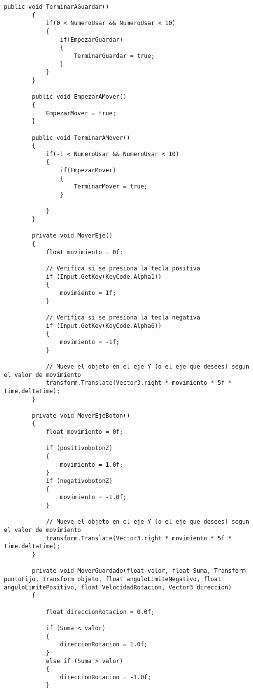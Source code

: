 \begin{lstlisting}[frame=single]
        public void TerminarAGuardar()
        {
            if(0 < NumeroUsar && NumeroUsar < 10)
            {
                if(EmpezarGuardar)
                {
                    TerminarGuardar = true;
                }
            }
        }
    
        public void EmpezarAMover()
        {
            EmpezarMover = true;
        }
    
        public void TerminarAMover()
        {
            if(-1 < NumeroUsar && NumeroUsar < 10)
            {
                if(EmpezarMover)
                {
                    TerminarMover = true;
                }
                
            }
        }
    
        private void MoverEje()
        {
            float movimiento = 0f;
    
            // Verifica si se presiona la tecla positiva
            if (Input.GetKey(KeyCode.Alpha1))
            {
                movimiento = 1f;
            }
    
            // Verifica si se presiona la tecla negativa
            if (Input.GetKey(KeyCode.Alpha6))
            {
                movimiento = -1f;
            }
    
            // Mueve el objeto en el eje Y (o el eje que desees) segun el valor de movimiento
            transform.Translate(Vector3.right * movimiento * 5f * Time.deltaTime);
        }
    
        private void MoverEjeBoton()
        {
            float movimiento = 0f;
    
            if (positivobotonZ)
            {
                movimiento = 1.0f;
            }
            if (negativobotonZ)
            {
                movimiento = -1.0f;
            }
    
            // Mueve el objeto en el eje Y (o el eje que desees) segun el valor de movimiento
            transform.Translate(Vector3.right * movimiento * 5f * Time.deltaTime);
        }
    
        private void MoverGuardado(float valor, float Suma, Transform puntoFijo, Transform objeto, float anguloLimiteNegativo, float anguloLimitePositivo, float VelocidadRotacion, Vector3 direccion)
        {
            
            float direccionRotacion = 0.0f;
    
            if (Suma < valor)
            {
                direccionRotacion = 1.0f;
            }
            else if (Suma > valor)
            {
                direccionRotacion = -1.0f;
            }
    

\end{lstlisting}
